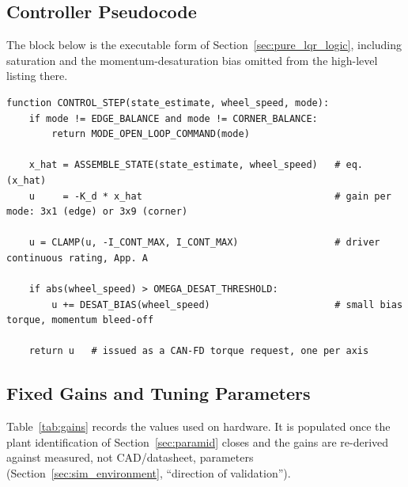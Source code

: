 \subsection{Controller Pseudocode}
\label{app:controller_pseudocode}

The block below is the executable form of Section~\ref{sec:pure_lqr_logic},
including saturation and the momentum-desaturation bias omitted from the
high-level listing there.

\begin{verbatim}
function CONTROL_STEP(state_estimate, wheel_speed, mode):
    if mode != EDGE_BALANCE and mode != CORNER_BALANCE:
        return MODE_OPEN_LOOP_COMMAND(mode)

    x_hat = ASSEMBLE_STATE(state_estimate, wheel_speed)   # eq. (x_hat)
    u     = -K_d * x_hat                                  # gain per mode: 3x1 (edge) or 3x9 (corner)

    u = CLAMP(u, -I_CONT_MAX, I_CONT_MAX)                 # driver continuous rating, App. A

    if abs(wheel_speed) > OMEGA_DESAT_THRESHOLD:
        u += DESAT_BIAS(wheel_speed)                      # small bias torque, momentum bleed-off

    return u   # issued as a CAN-FD torque request, one per axis
\end{verbatim}

\subsection{Fixed Gains and Tuning Parameters}
\label{app:gains}

Table~\ref{tab:gains} records the values used on hardware. It is populated
once the plant identification of Section~\ref{sec:paramid} closes and the
gains are re-derived against measured, not CAD/datasheet, parameters
(Section~\ref{sec:sim_environment}, ``direction of validation'').

